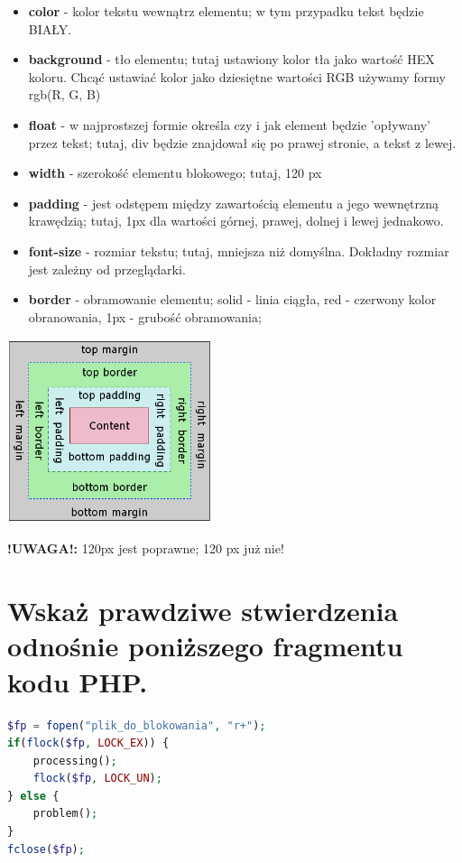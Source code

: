 \begin{itemize}
\item
\textbf{color} - kolor tekstu wewnątrz elementu; w tym przypadku tekst będzie BIAŁY.
\item
\textbf{background} - tło elementu; tutaj ustawiony kolor tła jako wartość HEX koloru. Chcąć ustawiać kolor jako dziesiętne wartości RGB używamy formy rgb(R, G, B)
\item
\textbf{float} - w najprostszej formie określa czy i jak element będzie 'opływany' przez tekst; tutaj, div będzie znajdował się po prawej stronie, a tekst z lewej.
\item
\textbf{width} - szerokość elementu blokowego; tutaj, 120 px
\item
\textbf{padding} - jest odstępem między zawartością elementu a jego wewnętrzną krawędzią; tutaj, 1px dla wartości górnej, prawej, dolnej i lewej jednakowo.
\item
\textbf{font-size} - rozmiar tekstu; tutaj, mniejsza niż domyślna. Dokładny rozmiar jest zależny od przeglądarki.
\item
\textbf{border} - obramowanie elementu; solid - linia ciągła, red - czerwony kolor obranowania, 1px - grubość obramowania;
\end{itemize}
\begin{center}
\includegraphics[width=6cm]{09/boxmodel}
\end{center}

\noindent
\textbf{!UWAGA!: }120px jest poprawne; 120 px już nie!

\section{Wskaż prawdziwe stwierdzenia odnośnie poniższego fragmentu kodu PHP.}
\begin{lstlisting}[language=php, frame=single]
$fp = fopen("plik_do_blokowania", "r+");
if(flock($fp, LOCK_EX)) {
    processing();
    flock($fp, LOCK_UN);
} else {
    problem();
}
fclose($fp);
\end{lstlisting}

